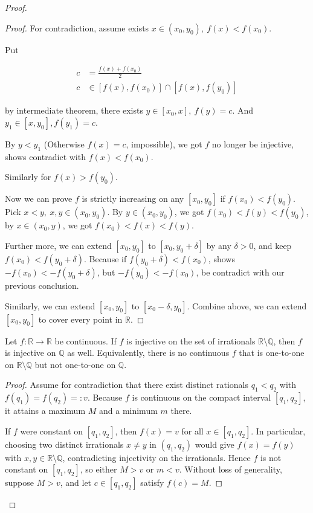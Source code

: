 \begin{proof}
\begin{proof}
    For contradiction, assume exists $x \in (x_0, y_0),\: f(x) < f(x_0)$.

    Put

    \begin{align*}
        c &= \frac{f(x) + f(x_0)}{2} \\
        c & \in [f(x), f(x_0)] \cap [f(x), f(y_0)] 
    \end{align*}

    by intermediate theorem, there exists $y \in [x_0, x],\: f(y) = c$.
    And $y_1 \in [x,y_0], f(y_1) = c$.

    By $y < y_1$ (Otherwise $f(x) = c$, impossible), we got $f$ no longer be injective, shows 
    contradict with $f(x) < f(x_0)$.

    Similarly for $f(x) > f(y_0)$.

    Now we can prove $f$ is strictly increasing on any $[x_0, y_0]$ if $f(x_0) < f(y_0)$. Pick $x <y,\: x,y \in (x_0, y_0)$. By $y \in (x_0, y_0)$,
    we got $f(x_0) < f(y) < f(y_0)$, by $x \in (x_0, y)$, we got $f(x_0) < f(x) < f(y)$.

    Further more, we can extend $[x_0, y_0]$ to $[x_0, y_0 + \delta]$ by any $\delta > 0$,
    and keep $f(x_0) < f(y_0 + \delta)$. Because if $f(y_0 + \delta) < f(x_0)$, 
    shows $-f(x_0) < - f(y_0 + \delta)$, but $-f(y_0) < -f(x_0)$, be contradict with our previous conclusion. 

    Similarly, we can extend $[x_0, y_0]$ to $[x_0 - \delta, y_0]$. Combine above, we can extend $[x_0, y_0]$
    to cover every point in $\mathbb{R}$.


\end{proof}

\begin{exercise}
Let $f:\mathbb{R}\to\mathbb{R}$ be continuous. If $f$ is injective on the set
of irrationals $\mathbb{R}\setminus\mathbb{Q}$, then $f$ is injective on $\mathbb{Q}$ as well.
Equivalently, there is no continuous $f$ that is one-to-one on $\mathbb{R}\setminus\mathbb{Q}$
but not one-to-one on $\mathbb{Q}$.
\end{exercise}

\begin{proof}
Assume for contradiction that there exist distinct rationals $q_1<q_2$ with
$f(q_1)=f(q_2)=:v$. Because $f$ is continuous on the compact interval $[q_1,q_2]$,
it attains a maximum $M$ and a minimum $m$ there.

If $f$ were constant on $[q_1,q_2]$, then $f(x)=v$ for all $x\in[q_1,q_2]$.
In particular, choosing two distinct irrationals $x\neq y$ in $(q_1,q_2)$ would give
$f(x)=f(y)$ with $x,y\in\mathbb{R}\setminus\mathbb{Q}$, contradicting injectivity on
the irrationals. Hence $f$ is not constant on $[q_1,q_2]$, so either $M>v$ or $m<v$.
Without loss of generality, suppose $M>v$, and let $c\in[q_1,q_2]$ satisfy $f(c)=M$.


\end{proof}
\end{proof}
